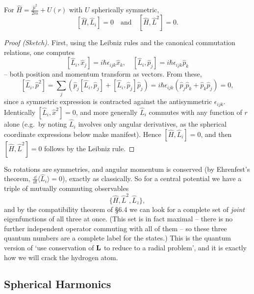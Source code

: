 \documentclass[a4paper]{scrartcl}
\begin{document}
\begin{proposition}
    For $\hat{H} = \frac{\hat{p}^2}{2m} + U(r)$ with $U$ spherically symmetric,
    $$
    [\hat{H}, \hat{L}_i] = 0 \quad \text{and} \quad [\hat{H}, \hat{L}^2] = 0.
    $$
\end{proposition}
\begin{proof}[Proof (Sketch)]
    First, using the Leibniz rules and the canonical commutation relations, one computes
    $$
    [\hat{L}_i, \hat{x}_j] = i \hbar \epsilon_{ijk} \hat{x}_k, \quad [\hat{L}_i, \hat{p}_j] = i \hbar \epsilon_{ijk} \hat{p}_k
    $$
    -- both position and momentum transform as vectors. From these,
    $$
    [\hat{L}_i, \hat{p}^2] = \sum_j \left( \hat{p}_j [\hat L_i, \hat p_j] + [\hat L_i, \hat p_j] \hat p_j \right) = i\hbar \epsilon_{ijk}\left( \hat p_j \hat p_k + \hat p_k \hat p_j \right) = 0,
    $$
    since a symmetric expression is contracted against the antisymmetric $\epsilon_{ijk}$. Identically $[\hat{L}_i, \hat{x}^2] = 0$, and more generally $\hat{L}_i$ commutes with any function of $r$ alone (e.g.\ by noting $\hat{L}_i$ involves only angular derivatives, as the spherical coordinate expressions below make manifest). Hence $[\hat{H}, \hat{L}_i] = 0$, and then $[\hat{H}, \hat{L}^2] = 0$ follows by the Leibniz rule.
\end{proof}

So rotations are symmetries, and angular momentum is conserved (by Ehrenfest's theorem, $\frac{\dd}{\dd t}\langle \hat L_i \rangle = 0$), exactly as classically. So for a central potential we have a triple of mutually commuting observables
$$
\{ \hat{H}, \hat{L}^2, \hat{L}_z \},
$$
and by the compatibility theorem of \S 6.4 we can look for a complete set of \emph{joint} eigenfunctions of all three at once. (This set is in fact maximal -- there is no further independent operator commuting with all of them -- so these three quantum numbers are a complete label for the states.) This is the quantum version of `use conservation of $\mathbf{L}$ to reduce to a radial problem', and it is exactly how we will crack the hydrogen atom.

\subsection{Spherical Harmonics}
\end{document}

